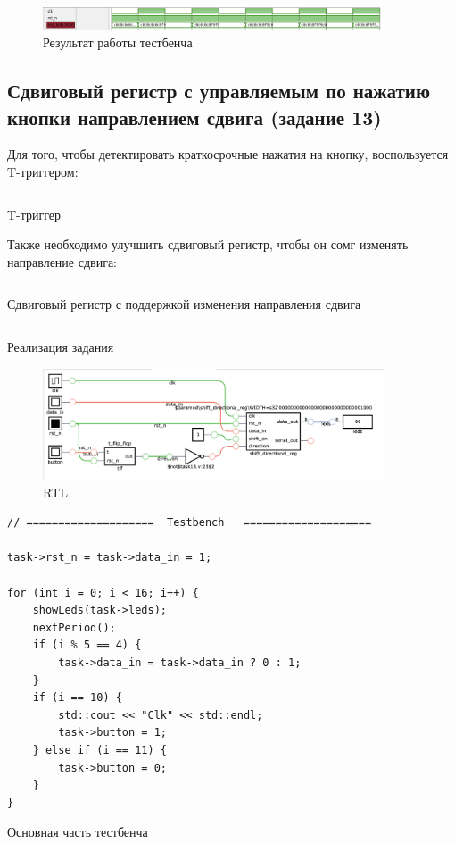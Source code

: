 \documentclass[a4paper]{article}
\begin{document}
  \begin{figure}[H]
    \centering
    \includegraphics[width=0.9\textwidth]{lab_328}
    \caption{Результат работы тестбенча}
  \end{figure}

  \subsection{Сдвиговый регистр с управляемым по нажатию кнопки направлением сдвига (задание 13)}

  Для того, чтобы детектировать краткосрочные нажатия на кнопку, воспользуется T-триггером:
  \begin{listing}[H]
    \inputminted{verilog}{../chapter_6/extra/13/t_flip_flop.v}
    \caption{T-триггер}
  \end{listing}

  Также необходимо улучшить сдвиговый регистр, чтобы он сомг изменять направление сдвига:
  \begin{listing}[H]
    \inputminted{verilog}{../chapter_6/extra/13/shift_directional_register.v}
    \caption{Сдвиговый регистр с поддержкой изменения направления сдвига}
  \end{listing}

  \begin{listing}[H]
    \inputminted{verilog}{../chapter_6/extra/13/task13.v}
    \caption{Реализация задания}
  \end{listing}

  \begin{figure}[H]
    \centering
    \includegraphics[width=0.9\textwidth]{lab_329.png}
    \caption{RTL}
  \end{figure}

  \begin{listing}[H]
    \begin{verbatim}
// ====================  Testbench   ====================

task->rst_n = task->data_in = 1;

for (int i = 0; i < 16; i++) {
    showLeds(task->leds);
    nextPeriod();
    if (i % 5 == 4) {
        task->data_in = task->data_in ? 0 : 1;
    }
    if (i == 10) {
        std::cout << "Clk" << std::endl;
        task->button = 1;
    } else if (i == 11) {
        task->button = 0;
    }
}
    \end{verbatim}
    \caption{Основная часть тестбенча}
  \end{listing}
\end{document}
